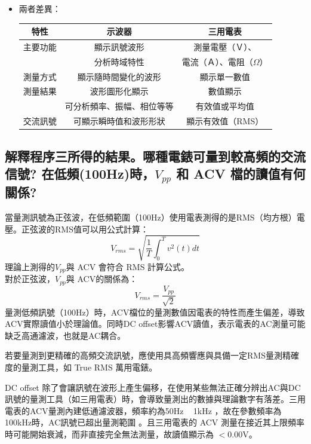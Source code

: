 \documentclass[12pt,a4paper]{article}
\begin{document}
\begin{CJK}{UTF8}{bkai}
\begin{itemize}
    \item 兩者差異：
    \begin{center}
        \begin{tabular}{c|c|c}
         特性 &   示波器 &   三用電表  \\
         \hline
         \hline
         主要功能   &   顯示訊號波形   & 測量電壓（Ｖ）、\\
            &   分析時域特性  &   電流（Ａ）、電阻（$\Omega$）\\
        \hline
        測量方式    &   顯示隨時間變化的波形  &   顯示單一數值\\
        \hline
        測量結果    &   波形圖形化顯示 &   數值顯示\\
            &   可分析頻率、振幅、相位等等   &   有效值或平均值\\
        \hline
        交流訊號    &   可顯示瞬時值和波形形狀 &   顯示有效值（RMS）\\
        \hline
    \end{tabular}
    \end{center}
    
\end{itemize}

\clearpage
\subsection{解釋程序三所得的結果。哪種電錶可量到較高頻的交流信號? 在低頻(100Hz)時，$V_{pp}$ 和 ACV 檔的讀值有何關係?}\label{subsec:3}
\hfill

當量測訊號為正弦波，在低頻範圍（100Hz）使用電表測得的是RMS（均方根）電壓。正弦波的RMS值可以用公式計算：
\begin{equation}
    V_{rms} = \sqrt{\frac{1}{T}\int^{T}_{0}v^{2}(t)dt}        
\end{equation}
理論上測得的$V_{pp}$與 ACV 會符合 RMS 計算公式。\\
對於正弦波，$V_{pp}$與 ACV的關係為：
\begin{equation}
    V_{rms} = \frac{V_{pp}}{\sqrt{2}}
\end{equation}
量測低頻訊號（100Hz）時，ACV檔位的量測數值因電表的特性而產生偏差，導致ACV實際讀值小於理論值。同時DC offset影響ACV讀值，表示電表的AC測量可能缺乏高通濾波，也就是AC耦合。

若要量測到更精確的高頻交流訊號，應使用具高頻響應與具備一定RMS量測精確度的量測工具，如 True RMS 萬用電錶。

DC offset 除了會讓訊號在波形上產生偏移，在使用某些無法正確分辨出AC與DC訊號的量測工具（如三用電表）時，會導致量測出的數據與理論數字有落差。三用電表的ACV量測內建低通濾波器，頻率約為50Hz ~ 1kHz ，故在參數頻率為100kHz時，AC訊號已超出量測範圍 。且三用電表的 ACV 測量在接近其上限頻率時可能開始衰減，而非直接完全無法測量，故讀值顯示為 $<$0.00V。


\end{CJK}
\end{document}
